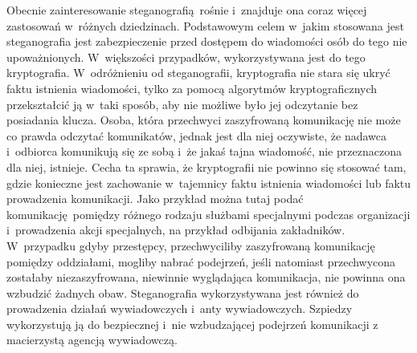 \documentclass[a4paper, twoside, 12pt]{report}
\begin{document}
        Obecnie zainteresowanie steganografią rośnie i~znajduje ona coraz więcej
        zastosowań w~różnych dziedzinach. Podstawowym celem w~jakim stosowana jest
        steganografia jest zabezpieczenie przed dostępem do wiadomości osób do tego nie
        upoważnionych. W~większości przypadków, wykorzystywana jest do tego
        kryptografia. W~odróżnieniu od steganografii, kryptografia nie stara się
        ukryć faktu istnienia wiadomości, tylko za pomocą algorytmów kryptograficznych
        przekształcić ją w~taki sposób, aby nie możliwe było jej odczytanie bez posiadania
        klucza. Osoba, która przechwyci zaszyfrowaną komunikację nie może co prawda
        odczytać komunikatów, jednak jest dla niej oczywiste, że nadawca i~odbiorca
        komunikują się ze sobą i~że jakaś tajna wiadomość, nie przeznaczona dla niej,
        istnieje.\cite{DIGITALWATERMARKING} Cecha ta sprawia, że kryptografii nie
        powinno się stosować tam, gdzie konieczne jest zachowanie w~tajemnicy
        faktu istnienia wiadomości lub faktu prowadzenia komunikacji. Jako przykład
        można tutaj podać komunikację pomiędzy różnego rodzaju służbami specjalnymi
        podczas organizacji i~prowadzenia akcji specjalnych, na przykład odbijania zakładników.
        W~przypadku gdyby przestępcy, przechwyciliby zaszyfrowaną komunikację
        pomiędzy oddziałami, mogliby nabrać podejrzeń, jeśli natomiast przechwycona
        zostałaby niezaszyfrowana, niewinnie wyglądająca komunikacja, nie powinna ona
        wzbudzić żadnych obaw. Steganografia wykorzystywana jest również do prowadzenia
        działań wywiadowczych i~anty wywiadowczych. Szpiedzy wykorzystują ją do
        bezpiecznej i~nie wzbudzającej podejrzeń komunikacji z macierzystą agencją
        wywiadowczą.
\end{document}
